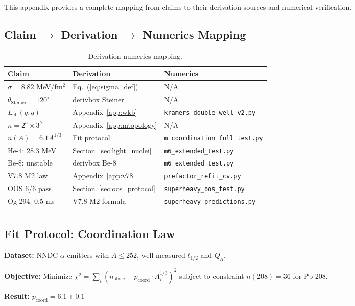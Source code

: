 \documentclass[11pt,a4paper]{article}
\begin{document}
This appendix provides a complete mapping from claims to their derivation sources and numerical verification.

\subsection{Claim $\to$ Derivation $\to$ Numerics Mapping}

{\small
\begin{longtable}{p{3.2cm}p{4.2cm}p{4.2cm}}
\toprule
\textbf{Claim} & \textbf{Derivation} & \textbf{Numerics} \\
\midrule
\endhead
$\sigma = 8.82$ MeV/fm$^2$ & Eq.~(\ref{eq:sigma_def}) & N/A \\
$\theta_{\text{Steiner}} = 120^\circ$ & derivbox Steiner & N/A \\
$L_{\text{eff}}(q, \dot{q})$ & Appendix~\ref{app:wkb} & \texttt{kramers\_double\_well\_v2.py} \\
$n = 2^a \times 3^b$ & Appendix~\ref{app:mtopology} & N/A \\
$n(A) = 6.1 A^{1/3}$ & Fit protocol & \texttt{m\_coordination\_full\_test.py} \\
He-4: 28.3 MeV & Section~\ref{sec:light_nuclei} & \texttt{m6\_extended\_test.py} \\
Be-8: unstable & derivbox Be-8 & \texttt{m6\_extended\_test.py} \\
V7.8 M2 law & Appendix~\ref{app:v78} & \texttt{prefactor\_refit\_cv.py} \\
OOS 6/6 pass & Section~\ref{sec:oos_protocol} & \texttt{superheavy\_oos\_test.py} \\
Og-294: 0.5 ms & V7.8 M2 formula & \texttt{superheavy\_predictions.py} \\
\bottomrule
\caption{Derivation-numerics mapping.}
\end{longtable}
}

\subsection{Fit Protocol: Coordination Law}

\textbf{Dataset:} NNDC $\alpha$-emitters with $A \leq 252$, well-measured $t_{1/2}$ and $Q_\alpha$.

\textbf{Objective:} Minimize $\chi^2 = \sum_i (n_{\text{obs},i} - p_{\mathrm{coord}} \cdot A_i^{1/3})^2$ subject to constraint $n(208) = 36$ for Pb-208.

\textbf{Result:} $p_{\mathrm{coord}} = 6.1 \pm 0.1$
\end{document}
